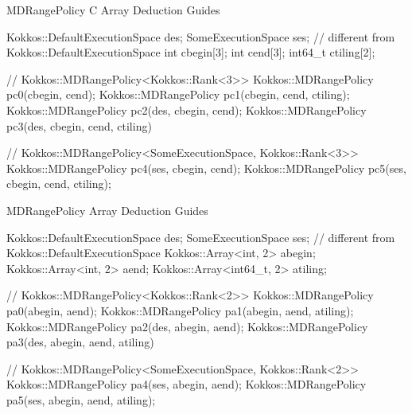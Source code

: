 
\begin{frame}[fragile]{MDRangePolicy C Array Deduction Guides}

\begin{code}[keywords={MDRangePolicy C Array}]

Kokkos::DefaultExecutionSpace des;
SomeExecutionSpace ses;            // different from Kokkos::DefaultExecutionSpace
int cbegin[3];
int cend[3];
int64_t ctiling[2];

// Kokkos::MDRangePolicy<Kokkos::Rank<3>>
Kokkos::MDRangePolicy pc0(cbegin, cend);
Kokkos::MDRangePolicy pc1(cbegin, cend, ctiling);
Kokkos::MDRangePolicy pc2(des, cbegin, cend);
Kokkos::MDRangePolicy pc3(des, cbegin, cend, ctiling)

// Kokkos::MDRangePolicy<SomeExecutionSpace, Kokkos::Rank<3>>
Kokkos::MDRangePolicy pc4(ses, cbegin, cend);
Kokkos::MDRangePolicy pc5(ses, cbegin, cend, ctiling);

\end{code}

\end{frame}

\begin{frame}[fragile]{MDRangePolicy Array Deduction Guides}

\begin{code}[keywords={MDRangePolicy Kokkos::Array}]

Kokkos::DefaultExecutionSpace des;
SomeExecutionSpace ses;            // different from Kokkos::DefaultExecutionSpace
Kokkos::Array<int, 2> abegin;
Kokkos::Array<int, 2> aend;
Kokkos::Array<int64_t, 2> atiling;

// Kokkos::MDRangePolicy<Kokkos::Rank<2>>
Kokkos::MDRangePolicy pa0(abegin, aend);
Kokkos::MDRangePolicy pa1(abegin, aend, atiling);
Kokkos::MDRangePolicy pa2(des, abegin, aend);
Kokkos::MDRangePolicy pa3(des, abegin, aend, atiling)

// Kokkos::MDRangePolicy<SomeExecutionSpace, Kokkos::Rank<2>>
Kokkos::MDRangePolicy pa4(ses, abegin, aend);
Kokkos::MDRangePolicy pa5(ses, abegin, aend, atiling);

\end{code}

\end{frame}

